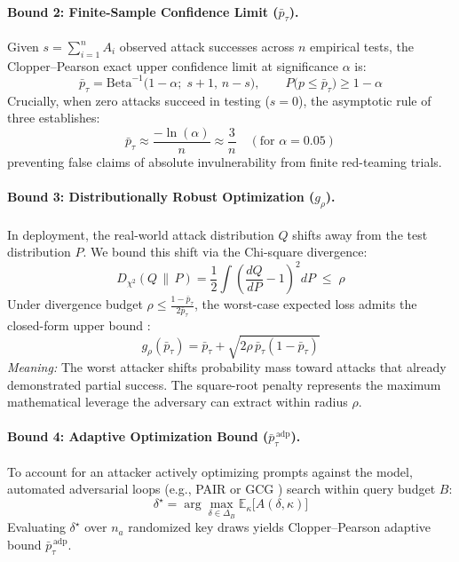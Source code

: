 \paragraph{Bound 2: Finite-Sample Confidence Limit ($\bar{p}_\tau$).}
Given $s = \sum_{i=1}^n A_i$ observed attack successes across $n$ empirical tests, the Clopper--Pearson exact upper confidence limit \cite{clopper1934} at significance $\alpha$ is:
\begin{equation}
    \bar{p}_\tau = \mathrm{Beta}^{-1}\big(1 - \alpha;\; s + 1,\, n - s\big), \qquad P\big(p \le \bar{p}_\tau\big) \ge 1 - \alpha
\end{equation}
Crucially, when zero attacks succeed in testing ($s = 0$), the asymptotic rule of three \cite{hanley1983} establishes:
\begin{equation}
    \bar{p}_\tau \approx \frac{-\ln(\alpha)}{n} \approx \frac{3}{n} \quad (\text{for } \alpha = 0.05)
\end{equation}
preventing false claims of absolute invulnerability from finite red-teaming trials.

\paragraph{Bound 3: Distributionally Robust Optimization ($g_\rho$).}
In deployment, the real-world attack distribution $Q$ shifts away from the test distribution $P$. We bound this shift via the Chi-square divergence:
\begin{equation}
    D_{\chi^2}(Q\,\|\,P) = \frac{1}{2} \int \left(\frac{dQ}{dP} - 1\right)^{\!2} dP \;\le\; \rho
\end{equation}
Under divergence budget $\rho \le \frac{1 - \bar{p}_\tau}{2\bar{p}_\tau}$, the worst-case expected loss admits the closed-form upper bound \cite{duchi2021dro}:
\begin{equation}
    g_\rho(\bar{p}_\tau) = \bar{p}_\tau + \sqrt{2\rho\,\bar{p}_\tau(1 - \bar{p}_\tau)}
\end{equation}
\emph{Meaning:} The worst attacker shifts probability mass toward attacks that already demonstrated partial success. The square-root penalty represents the maximum mathematical leverage the adversary can extract within radius $\rho$.

\paragraph{Bound 4: Adaptive Optimization Bound ($\bar{p}^{\,\mathrm{adp}}_\tau$).}
To account for an attacker actively optimizing prompts against the model, automated adversarial loops (e.g., PAIR \cite{chao2023pair} or GCG \cite{zou2023gcg}) search within query budget $B$:
\begin{equation}
    \delta^\star = \arg\max_{\delta \in \Delta_B} \mathbb{E}_{\kappa}\big[A(\delta, \kappa)\big]
\end{equation}
Evaluating $\delta^\star$ over $n_a$ randomized key draws yields Clopper--Pearson adaptive bound $\bar{p}^{\,\mathrm{adp}}_\tau$.

